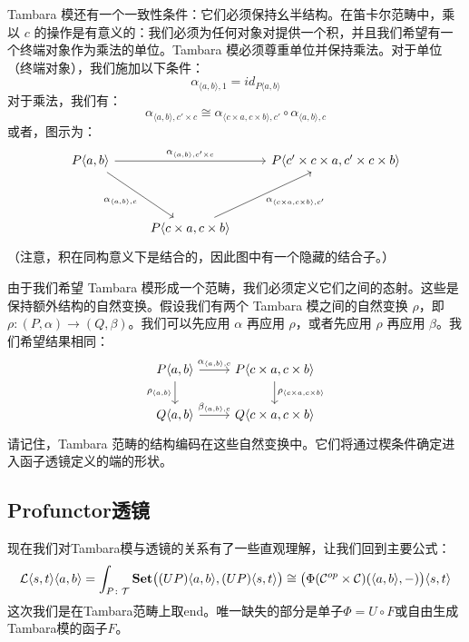 \documentclass[DaoFP]{subfiles}
\begin{document}
Tambara 模还有一个一致性条件：它们必须保持幺半结构。在笛卡尔范畴中，乘以 $c$ 的操作是有意义的：我们必须为任何对象对提供一个积，并且我们希望有一个终端对象作为乘法的单位。Tambara 模必须尊重单位并保持乘法。对于单位（终端对象），我们施加以下条件：
\[ \alpha_{\langle a, b \rangle, 1} = id _{P \langle a, b \rangle}\]
对于乘法，我们有：
\[ \alpha_{\langle a, b \rangle, c' \times c} \cong  \alpha_{\langle c \times a, c \times b \rangle, c'} \circ  \alpha_{\langle a, b \rangle, c}\]
或者，图示为：
\[
 \begin{tikzcd}
 P \langle a, b \rangle
 \arrow[rr, "{\alpha_{\langle a, b \rangle, c' \times c } }"]
 \arrow[rdd, "{ \alpha_{\langle a, b \rangle, c}}"']
 &&
 P \langle c' \times c \times a, c' \times c \times b \rangle
 \\
 \\
 & P \langle c \times a, c \times b \rangle
  \arrow[ruu, "{\alpha_{\langle c \times a, c \times b \rangle, c'}}"']
\end{tikzcd}
\]
（注意，积在同构意义下是结合的，因此图中有一个隐藏的结合子。）

由于我们希望 Tambara 模形成一个范畴，我们必须定义它们之间的态射。这些是保持额外结构的自然变换。假设我们有两个 Tambara 模之间的自然变换 $\rho$，即 $\rho \colon (P, \alpha) \to (Q, \beta) $。我们可以先应用 $\alpha$ 再应用 $\rho$，或者先应用 $\rho$ 再应用 $\beta$。我们希望结果相同：
\[
 \begin{tikzcd}
  P \langle a, b \rangle
 \arrow[d, "{ \rho_{\langle a, b \rangle}}"']
 \arrow[r, "{ \alpha_{\langle a, b \rangle, c}}"]
  &  P \langle c \times a, c \times b \rangle
  \arrow[d, "{ \rho_{\langle c \times a, c \times b \rangle}}"]
\\
   Q \langle a, b \rangle
 \arrow[r, "{ \beta_{\langle a, b \rangle, c}}"]
 &  Q \langle c \times a, c \times b \rangle
 \end{tikzcd}
\]
请记住，Tambara 范畴的结构编码在这些自然变换中。它们将通过楔条件确定进入函子透镜定义的端的形状。

\subsection{Profunctor透镜}

现在我们对Tambara模与透镜的关系有了一些直观理解，让我们回到主要公式：
\[  \mathcal{L}\langle s, t\rangle \langle a, b \rangle =\int_{P \colon \mathcal{T}} \mathbf{Set} \big((U P) \langle a, b\rangle, (U P) \langle s, t\rangle \big) \cong \big( \Phi (\mathcal{C}^{op} \times \mathcal{C}) (\langle a, b\rangle ,-) \big) \langle s, t\rangle \]
这次我们是在Tambara范畴上取end。唯一缺失的部分是单子$\Phi = U \circ F$或自由生成Tambara模的函子$F$。
\end{document}
